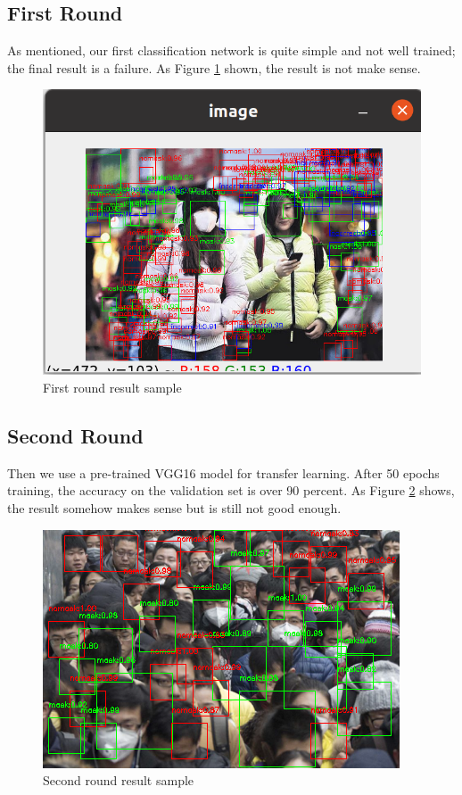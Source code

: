 \documentclass[10pt,a4paper]{report}
\begin{document}
\subsection{First Round}
As mentioned, our first classification network is quite simple and not well trained; the final result is a failure. As Figure \ref{fig:f1} shown, the result is not make sense.
 \begin{figure}[hbtp]

\centering
\includegraphics[scale=0.4]{imgs/r1.png}
\caption{First round result sample}
        \label{fig:f1}
\end{figure}

\subsection{Second Round}
Then we use a pre-trained VGG16 model for transfer learning. After 50 epochs training, the accuracy on the validation set is over 90 percent. As Figure \ref{fig:f2} shows, the result somehow makes sense but is still not good enough.
\begin{figure}[hbtp]

\centering
\includegraphics[scale=1.5]{imgs/r2.png}
\caption{Second round result sample}
        \label{fig:f2}
\end{figure}
\end{document}
